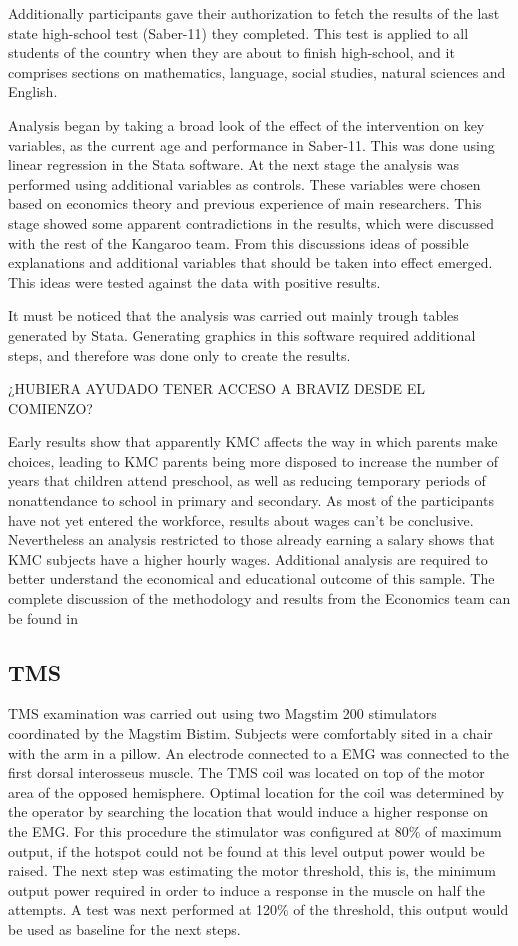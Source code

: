Additionally participants gave their authorization to fetch the results of the last state high-school test (Saber-11) they completed. This test is applied to all students of the country when they are about to finish high-school, and it comprises sections on mathematics, language, social studies, natural sciences and English.

Analysis began by taking a broad look of the effect of the intervention on key variables, as the current age and performance in Saber-11. This was done using linear regression in the Stata software. At the next stage the analysis was performed using additional variables as controls. These variables were chosen based on economics theory and previous experience of main researchers. This stage showed some apparent contradictions in the results, which were discussed with the rest of the Kangaroo team. From this discussions ideas of possible explanations and additional variables that should be taken into effect emerged. This ideas were tested against the data with positive results. 

It must be noticed that the analysis was carried out mainly trough tables generated by Stata. Generating graphics in this software required additional steps, and therefore was done only to create the results.

¿HUBIERA AYUDADO TENER ACCESO A BRAVIZ DESDE EL COMIENZO?

Early results show that apparently KMC affects the way in which parents make choices, leading to KMC parents being more disposed to increase the number of years that children attend preschool, as well as reducing temporary periods of nonattendance to school in primary and secondary. As most of the participants have not yet entered the workforce, results about wages can't be conclusive. Nevertheless an analysis restricted to those already earning a salary shows that KMC subjects have a higher hourly wages. Additional analysis are required to better understand the economical and educational outcome of this sample.  The complete discussion of the methodology and results from the Economics team can be found in \autocite{?}
\subsection{TMS}

TMS examination was carried out using two Magstim 200 stimulators coordinated by the Magstim Bistim. Subjects were comfortably sited in a chair with the arm in a pillow. An electrode connected to a EMG was connected to the first dorsal interosseus muscle. The TMS coil was located on top of the motor area of the opposed hemisphere. Optimal location for the coil was determined by the operator by searching the location that would induce a higher response on the EMG. For this procedure the stimulator was configured at 80\% of maximum output, if the hotspot could not be found at this level output power would be raised. The next step was estimating the motor threshold, this is, the minimum output power required in order to induce a response in the muscle on half the attempts. A test was next performed at 120\% of the threshold, this output would be used as baseline for the next steps.

